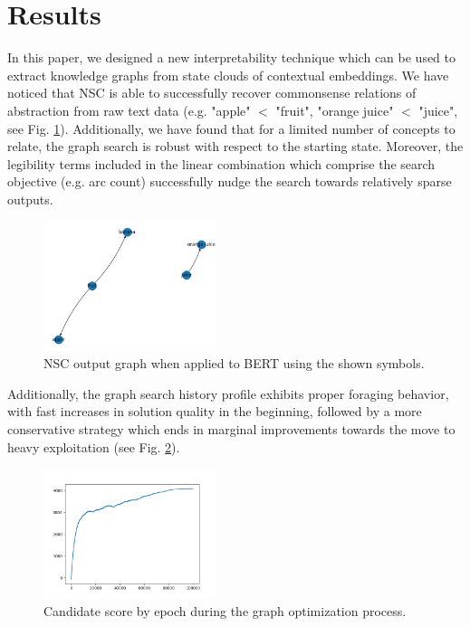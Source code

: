 \section{Results}\label{sec:results}

In this paper, we designed a new interpretability technique which can be used to extract knowledge graphs from state clouds of contextual embeddings. We have noticed that NSC is able to successfully recover commonsense relations of abstraction from raw text data (e.g. "apple" $<$ "fruit", "orange juice" $<$ "juice", see Fig. \ref{fig:nsc_output_graph}). Additionally, we have found that for a limited number of concepts to relate, the graph search is robust with respect to the starting state. Moreover, the legibility terms included in the linear combination which comprise the search objective (e.g. arc count) successfully nudge the search towards relatively sparse outputs.

\begin{figure}[h]
    \centering
    \includegraphics[width=0.45\textwidth]{img/distinct graphs.png}
    \caption{NSC output graph when applied to BERT using the shown symbols.}\label{fig:nsc_output_graph}
\end{figure}

Additionally, the graph search history profile exhibits proper foraging behavior, with fast increases in solution quality in the beginning, followed by a more conservative strategy which ends in marginal improvements towards the move to heavy exploitation (see Fig. \ref{fig:nsc_score_history}).

\begin{figure}[h]
    \centering
    \includegraphics[width=0.45\textwidth]{img/score1.png}
    \caption{Candidate score by epoch during the graph optimization process.}\label{fig:nsc_score_history}
\end{figure}

